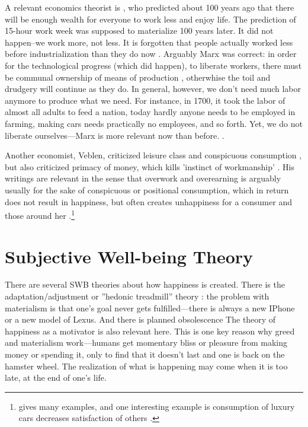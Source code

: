 \documentclass[10pt, letterpaper]{article}
\begin{document}
\begin{spacing}{1.8}
A relevant economics theorist is \citet{keynes30}, who predicted about 100 years
ago that there will be enough wealth for everyone to work less and enjoy
life. The prediction of 15-hour work week was supposed to materialize 100 years later.
It did not happen--we work more, not less. It is forgotten that people
actually worked less before industrialization than they do now
\citep{schor08}. %
 Arguably Marx was correct: in order for the technological progress (which
 did happen), to liberate workers, there must be communal ownership of means of
 production \citep{spencer20}, otherwhise the toil and drudgery will continue as
 they do. 
In general, however, we don't need much labor anymore to produce what we need. For instance,
 in 1700, it took the labor of almost all adults to feed a nation, today hardly anyone needs to be employed in farming, making cars needs practically no employees, and so forth. Yet, we do not liberate ourselves---Marx is more relevant now than before.%
\citep{piketty14,peet15,menandMISC16oct3}. %

Another economist, Veblen, criticized leisure class and conspicuous consumption
\citep{veblen05a,veblen05b}, but also criticized  primacy of money, which kills
'instinct of workmanship' \citep{spencer20}. His writings are relevant in the sense that overwork
and overearning is arguably usually for the sake of conspicuous or positional
consumption, which in return does not result in happiness, but often creates
unhappiness for a consumer and those around her
\citep{frank12,frank_nyt_mar_20_14,frank08,frank04,kasser13,schmuck00}.\footnote{\citet{frank12} gives many examples, and one interesting example is consumption of luxury cars decreases satisfaction of others \citep{winkelmann12}.}


\section{Subjective Well-being Theory}

There are several SWB theories about how happiness is created. There is the adaptation/adjustment or ''hedonic treadmill'' theory \citep{brickman78cj}: the problem with materialism is that one's goal never gets fulfilled---there is
always a new IPhone or a new model of Lexus. And there is planned obsolescence \citep{satyro2018planned,agrawal2016limits} %
%
The theory of happiness as a motivator \citep{carver90} is also relevant
here. This is one key reason why greed and materialism  work---humans get
momentary bliss or pleasure from making money or spending it, only to find that
it doesn't last and one is back on the hamster wheel. The realization of
what is happening may come when it is too late, at the end of one's life.


\end{spacing}
\end{document}
